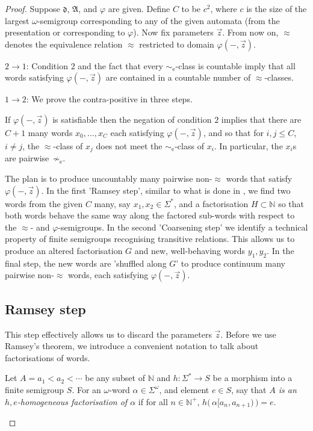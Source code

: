 \documentclass{stacs_proc}
\newcommand{\Nat}{\mathbb{N}}
\newcommand{\eqe}{\sim_{\textrm{e}}}
\newcommand{\frakd}{\mathfrak{d}}
\newcommand{\frakA}{\mathfrak{A}}
\begin{document}
\begin{proof}
Suppose $\frakd$, $\frakA$, and $\varphi$ are given.  Define $C$ to be $c^2$,
where $c$ is the size of the largest $\omega$-semigroup corresponding to any of
the given automata (from the presentation or corresponding to $\varphi$).  Now
fix parameters $\vec{z}$. From now on, $\approx$ denotes the equivalence
relation $\approx$ restricted to domain $\varphi(-,\vec{z})$.

$2 \rightarrow 1$: Condition $2$ and the fact that every $\eqe$-class is
countable imply that all words satisfying $\varphi(-,\vec{z})$ are contained  
in a countable number of $\approx$-classes.

$1 \rightarrow 2$: We prove the contra-positive in three steps. 



If $\varphi(-,\vec{z})$ is satisfiable then the negation of condition $2$ 
implies that there are $C+1$ many words $x_0, \ldots, x_C$ each satisfying 
$\varphi(-,\vec{z})$, and so that for $i,j \leq C$, $i \neq j$, the $\approx$-class 
of $x_j$ does not meet the $\eqe$-class of $x_i$. In particular, the $x_i$s are 
pairwise~$\not\eqe$. 

The plan is to produce uncountably many pairwise non-$\approx$ words that
satisfy $\varphi(-,\vec{z})$. In the first 'Ramsey step', similar to
what is done in \cite{KL06}, we find two words from the given $C$ many,
say $x_1,x_2 \in \Sigma^\ast$, and a factorisation $H \subset \Nat$ so that
both words behave the same way along the factored sub-words with
respect to the $\approx$- and $\varphi$-semigroups. 
In the second 'Coarsening step' we identify a technical property of finite
semigroups recognising transitive relations. This allows us to produce
an altered factorisation $G$ and new, well-behaving words $y_1,y_2$. 
In the final step, the new words are 'shuffled along $G$'
to produce continuum many pairwise non-$\approx$ words, each satisfying
$\varphi(-,\vec{z})$.


\vskip-0.3cm
\subsection{Ramsey step}

This step effectively allows us to discard the parameters $\vec{z}$.
Before we use Ramsey's theorem, we introduce a convenient notation 
to talk about factorisations of words.

\begin{definition}
Let $A = a_1 < a_2 < \cdots$ be any subset of $\Nat$ and $h:\Sigma^\ast \to S$ 
be a morphism into a finite semigroup $S$.
For an $\omega$-word $\alpha \in \Sigma^\omega$, and element $e \in S$, 
say that {\em $A$ is an $h,e$-homogeneous factorisation of $\alpha$} if
for all $n \in \Nat^+$, $h\big(\,\alpha[a_n,a_{n+1})\,\big) = e$.  
\end{definition}


\end{proof}
\end{document}
